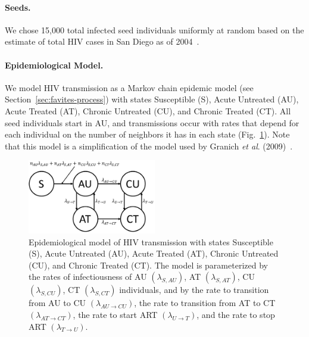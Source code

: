 \paragraph{Seeds.} We chose 15,000 total infected seed individuals uniformly at random based on the estimate of total \gls{HIV} cases in San Diego as of 2004~\cite{Macchione2015}.

\paragraph{Epidemiological Model.} We model \gls{HIV} transmission as a Markov chain epidemic model (see Section~\ref{sec:favites-process}) with states Susceptible (S), Acute Untreated (AU), Acute Treated (AT), Chronic Untreated (CU), and Chronic Treated (CT). All seed individuals start in AU, and transmissions occur with rates that depend for each individual on the number of neighbors it has in each state (Fig.~\ref{fig:favites-model}). Note that this model is a simplification of the model used by Granich \textit{et al}. (2009)~\cite{Granich2009}.

\begin{figure} %
\centering
\includegraphics[width=0.5\textwidth]{figs/favites-model}
\caption[FAVITES Model]
{Epidemiological model of \gls{HIV} transmission with states Susceptible (S), Acute Untreated (AU), Acute Treated (AT), Chronic Untreated (CU), and Chronic Treated (CT). The model is parameterized by the rates of infectiousness of AU $(\lambda_{S,AU})$,  AT $(\lambda_{S,AT})$, CU $(\lambda_{S,CU})$, CT $(\lambda_{S,CT})$ individuals, and by the rate to transition from AU to CU $(\lambda_{AU \rightarrow CU})$, the rate to transition from AT to CT $(\lambda_{AT \rightarrow CT})$, the rate to start \gls{ART} $(\lambda_{U \rightarrow T})$, and the rate to stop ART $(\lambda_{T \rightarrow U})$.}
\label{fig:favites-model}
\end{figure}

